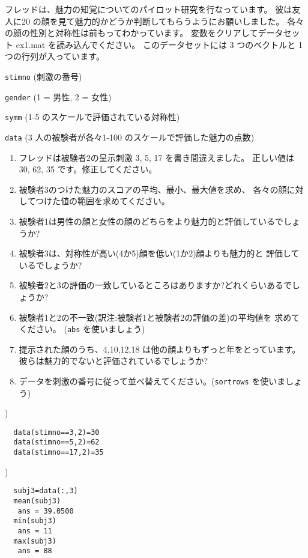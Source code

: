 \documentclass{jsarticle}
\begin{document}
\begin{boxnote}
フレッドは、魅力の知覚についてのパイロット研究を行なっています。
彼は友人に20 の顔を見て魅力的かどうか判断してもらうようにお願いしました。
各々の顔の性別と対称性は前もってわかっています。
変数をクリアしてデータセット ex1.mat を読み込んでください。
このデータセットには 3 つのベクトルと 1 つの行列が入っています。

{\tt stimno} (刺激の番号)

{\tt gender} (1 = 男性, 2 = 女性)

{\tt symm} (1-5 のスケールで評価されている対称性)

{\tt data} (3 人の被験者が各々1-100 のスケールで評価した魅力の点数)

\begin{enumerate}
\item フレッドは被験者2の呈示刺激 3, 5, 17 を書き間違えました。
正しい値は 30, 62, 35 です。修正してください。
\item 被験者3のつけた魅力のスコアの平均、最小、最大値を求め、
各々の顔に対してつけた値の範囲を求めてください。
\item 被験者1は男性の顔と女性の顔のどちらをより魅力的と評価しているでしょうか?
\item 被験者3は、対称性が高い(4か5)顔を低い(1か2)顔よりも魅力的と
評価しているでしょうか?
\item 被験者2と3の評価の一致しているところはありますか?どれくらいあるでしょうか?
\item 被験者1と2の不一致(訳注:被験者1と被験者2の評価の差)の平均値を
求めてください。 ({\tt abs} を使いましょう)
\item 提示された顔のうち、4,10,12,18 は他の顔よりもずっと年をとっています。
彼らは魅力的でないと評価されているでしょうか?
\item データを刺激の番号に従って並べ替えてください。({\tt sortrows} を使いましょう)
\end{enumerate}

\end{boxnote}


)

\begin{verbatim}
  data(stimno==3,2)=30
  data(stimno==5,2)=62
  data(stimno==17,2)=35
\end{verbatim}

\bigskip

)

\begin{verbatim}
  subj3=data(:,3)
  mean(subj3) 
   ans = 39.0500
  min(subj3) 
   ans = 11
  max(subj3) 
   ans = 88
\end{verbatim}
\end{document}

